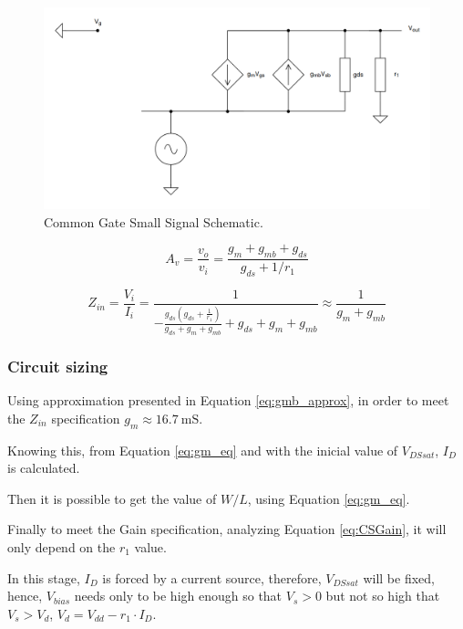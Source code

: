 \begin{figure}[h]
    \centering
    \includegraphics[width=1\textwidth]{Images/CG_SmallSignal.png}
    \caption{Common Gate Small Signal Schematic.}
    \label{fig:CG_SmallSignal}
\end{figure}

\begin{equation}
    A_v = \frac{v_o}{v_i}=\frac{g_m+g_{mb}+g_{ds}}{g_{ds}+1/r_1}
    \label{eq:CSGain}
\end{equation}

\begin{equation}
    Z_{in} = \frac{V_i}{I_i}=\frac{1}{- \frac{g_{ds} \left(g_{ds} + \frac{1}{r_{1}}\right)}{g_{ds} + g_{m} + g_{mb}} + g_{ds} + g_{m} + g_{mb}}\approx\frac{1}{g_m+g_{mb}}
    \label{eq:CG_Zin}
\end{equation}

\subsubsection{Circuit sizing}

Using approximation presented in Equation \ref{eq:gmb_approx}, in order to meet the $Z_{in}$ specification $g_m \approx \SI{16.7}{\milli\siemens}$.

Knowing this, from Equation \ref{eq:gm_eq} and with the inicial value of $V_{DSsat}$, $I_D$ is calculated.

Then it is possible to get the value of $W/L$, using Equation \ref{eq:gm_eq}.

Finally to meet the Gain specification, analyzing Equation \ref{eq:CSGain}, it will only depend on the $r_1$ value. 

In this stage, $I_D$ is forced by a current source, therefore, $V_{DSsat}$ will be fixed, hence, $V_{bias}$ needs only to be high enough so that $V_{s }> 0$ but not so high that $V_s > V_d$, $V_d = V_{dd} - r_1\cdot I_D$. 

